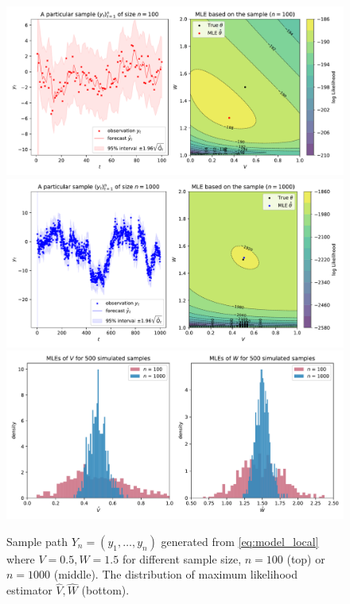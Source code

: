 \documentclass[12pt,a4paper]{article}
\begin{document}
\begin{itemize}
  \begin{figure}[t]\centering%
    \includegraphics[width=480pt]{figures/fig_local_level_model_100.pdf}
    \includegraphics[width=480pt]{figures/fig_local_level_model_1000.pdf}
    \includegraphics[width=465pt]{figures/fig_local_level_model_MLE_distribution.pdf}
    \caption{%
      Sample path $Y_{n}=(y_{1},\ldots, y_{n})$ generated from \eqref{eq:model_local} where $V=0.5, W=1.5$
      for different sample size, $n=100$ (top) or $n=1000$ (middle).
      The distribution of maximum likelihood estimator $\hat{V}, \hat{W}$ (bottom). 
    } 
    \label{fig:local_level}
  \end{figure} 

\end{itemize}
\end{document}
